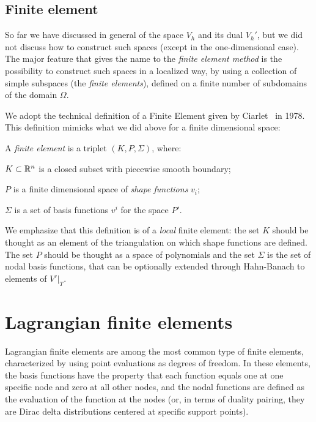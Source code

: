 
\subsection{Finite element}

So far we have discussed in general of the space $V_h$ and its dual $V_h'$, but we did not discuss how to construct such spaces (except in the one-dimensional case). The major feature that gives the name to the \emph{finite element method} is the possibility to construct such spaces in a localized way, by using a collection of simple subspaces (the \emph{finite elements}), defined on a finite number of subdomains of the domain $\Omega$.

We adopt the technical definition of a Finite Element given by
Ciarlet~\cite{ciarlet78} in 1978. This definition mimicks what we did above for
a finite dimensional space:
\begin{definition}[Ciarlet, 1978] 
A \emph{finite element} is a triplet $(K,P,\Sigma)$, where:
\begin{romanlist}
\item $K\subset \mathbb{R}^n$ is a closed subset with piecewise smooth boundary;
\item $P$ is a finite dimensional space of \emph{shape functions} $v_i$;
\item $\Sigma$ is a set of basis functions $v^i$ for the space $P'$.
\end{romanlist}
\end{definition}

We emphasize that this definition is of a \emph{local} finite element: the set $K$ should be thought as an element of the triangulation on which shape functions are defined. The set $P$ should be thought as a space of polynomials and the set $\Sigma$ is the set of nodal basis functions, that can be optionally extended through Hahn-Banach to elements of $V'|_T$.

\section{Lagrangian finite elements}

Lagrangian finite elements are among the most common type of finite elements, characterized by using point evaluations as degrees of freedom. In these elements, the basis functions have the property that each function equals one at one specific node and zero at all other nodes, and the nodal functions are defined as the evaluation of the function at the nodes (or, in terms of duality pairing, they are Dirac delta distributions centered at specific support points).

